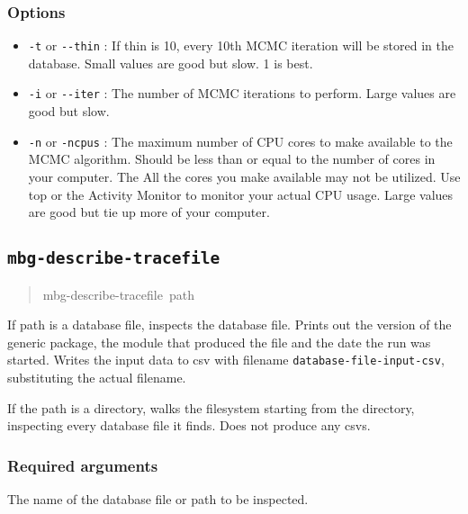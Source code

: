 \subsubsection{Options}
\label{sec:options}
\begin{itemize}
\item {} 
\texttt{-t} or \texttt{-{}-thin} : If thin is 10, every 10th MCMC iteration will be stored in the
database. Small values are good but slow. 1 is best.

\item {} 
\texttt{-i} or \texttt{-{}-iter} : The number of MCMC iterations to perform. Large values are good
but slow.

\item {} 
\texttt{-n} or \texttt{-ncpus} : The maximum number of CPU cores to make available to the MCMC
algorithm. Should be less than or equal to the number of cores in your computer. The
All the cores you make available may not be utilized. Use top or the Activity Monitor
to monitor your actual CPU usage. Large values are good but tie up more of your computer.

\end{itemize}





\subsection{\texttt{mbg-describe-tracefile}}
\label{sec:mbg-describe-tracefile}
\begin{quote}{\ttfamily \raggedright \noindent
mbg-describe-tracefile~path
}\end{quote}

If path is a database file, inspects the database file. Prints out the version of the
generic package, the module that produced the file and the date the run was started.
Writes the input data to csv with filename \texttt{database-file-input-csv}, substituting
the actual filename.

If the path is a directory, walks the filesystem starting from the directory, inspecting
every database file it finds. Does not produce any csvs.





\subsubsection{Required arguments}
\label{sec:id1}
\setcounter{listcnt0}{0}
\begin{list}{.}
{
\setlength{\rightmargin}{\leftmargin}
}
\item {} 
The name of the database file or path to be inspected.

\end{list}


